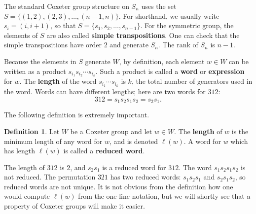 \documentclass{article}
\numberwithin{equation}{section}
\newcommand{\newword}[1]{\textbf{#1}}
\theoremstyle{remark}
\theoremstyle{definition}
\newtheorem{definition}[theorem]{Definition}
\begin{document}
	The standard Coxeter group structure on $S_n$ uses the set $S = \{(1,2), (2,3), \ldots, (n-1,n)   \}$. For shorthand, we usually write $s_i = (i,i+1)$, so that $S = \{s_1,s_2,\ldots, s_{n-1}\}$. For the symmetric group, the elements of $S$ are also called \newword{simple transpositions}. One can check that the simple transpositions have order $2$ and generate $S_n$. The rank of $S_n$ is $n-1$.
	
	Because the elements in $S$ generate $W$, by definition, each element $w\in W$ can be written as a product $s_{i_1}s_{i_2}\cdots s_{i_k}$. Such a product is called a \newword{word} or \newword{expression} for $w$. The \newword{length} of the word $s_{i_1}\cdots s_{i_k}$ is $k$, the total number of generators used in the word. Words can have different lengths; here are two words for $312$:
	\[  312 = s_1s_2s_1s_2 = s_2s_1. \]
	
	The following definition is extremely important.
	\begin{definition}
		Let $W$ be a Coxeter group and let $w\in W$. The \newword{length} of $w$ is the minimum length of any word for $w$, and is denoted $\ell(w)$. A word for $w$ which has length $\ell(w)$ is called a \newword{reduced word}. 
	\end{definition}
	
	
	The length of $312$ is $2$, and $s_2s_1$ is a reduced word for $312$. The word $s_1s_2s_1s_2$ is not reduced. The permutation $321$ has two reduced words: $s_1s_2s_1$ and $s_2s_1s_2$, so reduced words are not unique. It is not obvious from the definition how one would compute $\ell(w)$ from the one-line notation, but we will shortly see that a property of Coxeter groups will make it easier.
	
	
%	
%	
	
\end{document}

